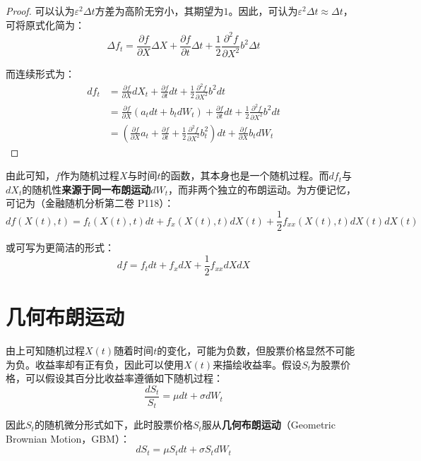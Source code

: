 \documentclass[11pt]{article}
\begin{document}
\begin{proof}
    可以认为$\varepsilon^2 \Delta t$方差为高阶无穷小，其期望为$1$。因此，可认为$\varepsilon^2 \Delta t \approx \Delta t$，可将原式化简为：
    \begin{equation*}
        \Delta f_t = \frac{\partial f}{\partial X} \Delta X + \frac{\partial f}{\partial t} \Delta t + \frac{1}{2} \frac{\partial^2 f}{\partial X^2} b^2 \Delta t
    \end{equation*}

    而连续形式为：
    \begin{align*}
        df_t & = \frac{\partial f}{\partial X}  dX_t + \frac{\partial f}{\partial t} dt + \frac{1}{2} \frac{\partial^2 f}{\partial X^2} b^2 dt \\
        & = \frac{\partial f}{\partial X} (a_t dt + b_t dW_t) + \frac{\partial f}{\partial t} dt + \frac{1}{2} \frac{\partial^2 f}{\partial X^2} b^2 dt \\
        & = \left(\frac{\partial f}{\partial X}a_t  + \frac{\partial f}{\partial t} + \frac{1}{2}\frac{\partial^2 f}{\partial X^2} b^2_t \right)dt + \frac{\partial f}{\partial X} b_t dW_t
    \end{align*}
\end{proof}

由此可知，$f$作为随机过程$X$与时间$t$的函数，其本身也是一个随机过程。而$df_t$与$dX_t$的随机性\textbf{来源于同一布朗运动}$dW_t$，而非两个独立的布朗运动。为方便记忆，可记为（金融随机分析第二卷 P118）：
\begin{equation*}
    \boxed{
        df(X(t),t) = f_t(X(t),t)dt + f_x(X(t),t)dX(t) + \frac{1}{2}f_{xx}(X(t),t)dX(t)dX(t)
    }
\end{equation*}

或可写为更简洁的形式：
\begin{equation*}
    \boxed{
        df = f_t dt + f_x dX + \frac{1}{2}f_{xx}dXdX
    }
\end{equation*}

\section{几何布朗运动}

由上可知随机过程$X(t)$随着时间$t$的变化，可能为负数，但股票价格显然不可能为负。收益率却有正有负，因此可以使用$X(t)$来描绘收益率。假设$S_t$为股票价格，可以假设其百分比收益率遵循如下随机过程：
\begin{equation*}
    \frac{dS_t}{S_t} = \mu dt + \sigma dW_t
\end{equation*}

因此$S_t$的随机微分形式如下，此时股票价格$S_t$服从\textbf{几何布朗运动}（Geometric Brownian Motion，GBM）：
\begin{equation*}
    dS_t = \mu S_t dt + \sigma S_t dW_t
\end{equation*}
\end{document}

